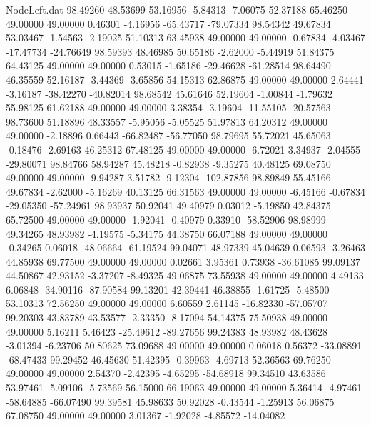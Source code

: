 \begin{filecontents}{NodeLeft.dat}
  98.49260   48.53699   53.16956    -5.84313   -7.06075   52.37188   65.46250   49.00000   49.00000    0.46301   -4.16956  -65.43717  -79.07334
  98.54342   49.67834   53.03467    -1.54563   -2.19025   51.10313   63.45938   49.00000   49.00000   -0.67834   -4.03467  -17.47734  -24.76649
  98.59393   48.46985   50.65186    -2.62000   -5.44919   51.84375   64.43125   49.00000   49.00000    0.53015   -1.65186  -29.46628  -61.28514
  98.64490   46.35559   52.16187    -3.44369   -3.65856   54.15313   62.86875   49.00000   49.00000    2.64441   -3.16187  -38.42270  -40.82014
  98.68542   45.61646   52.19604    -1.00844   -1.79632   55.98125   61.62188   49.00000   49.00000    3.38354   -3.19604  -11.55105  -20.57563
  98.73600   51.18896   48.33557    -5.95056   -5.05525   51.97813   64.20312   49.00000   49.00000   -2.18896    0.66443  -66.82487  -56.77050
  98.79695   55.72021   45.65063    -0.18476   -2.69163   46.25312   67.48125   49.00000   49.00000   -6.72021    3.34937   -2.04555  -29.80071
  98.84766   58.94287   45.48218    -0.82938   -9.35275   40.48125   69.08750   49.00000   49.00000   -9.94287    3.51782   -9.12304 -102.87856
  98.89849   55.45166   49.67834    -2.62000   -5.16269   40.13125   66.31563   49.00000   49.00000   -6.45166   -0.67834  -29.05350  -57.24961
  98.93937   50.92041   49.40979     0.03012   -5.19850   42.84375   65.72500   49.00000   49.00000   -1.92041   -0.40979    0.33910  -58.52906
  98.98999   49.34265   48.93982    -4.19575   -5.34175   44.38750   66.07188   49.00000   49.00000   -0.34265    0.06018  -48.06664  -61.19524
  99.04071   48.97339   45.04639     0.06593   -3.26463   44.85938   69.77500   49.00000   49.00000    0.02661    3.95361    0.73938  -36.61085
  99.09137   44.50867   42.93152    -3.37207   -8.49325   49.06875   73.55938   49.00000   49.00000    4.49133    6.06848  -34.90116  -87.90584
  99.13201   42.39441   46.38855    -1.61725   -5.48500   53.10313   72.56250   49.00000   49.00000    6.60559    2.61145  -16.82330  -57.05707
  99.20303   43.83789   43.53577    -2.33350   -8.17094   54.14375   75.50938   49.00000   49.00000    5.16211    5.46423  -25.49612  -89.27656
  99.24383   48.93982   48.43628    -3.01394   -6.23706   50.80625   73.09688   49.00000   49.00000    0.06018    0.56372  -33.08891  -68.47433
  99.29452   46.45630   51.42395    -0.39963   -4.69713   52.36563   69.76250   49.00000   49.00000    2.54370   -2.42395   -4.65295  -54.68918
  99.34510   43.63586   53.97461    -5.09106   -5.73569   56.15000   66.19063   49.00000   49.00000    5.36414   -4.97461  -58.64885  -66.07490
  99.39581   45.98633   50.92028    -0.43544   -1.25913   56.06875   67.08750   49.00000   49.00000    3.01367   -1.92028   -4.85572  -14.04082

\end{filecontents}
